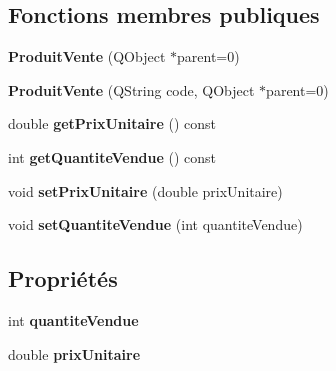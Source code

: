 \subsection*{Fonctions membres publiques}
\begin{DoxyCompactItemize}
\item 
\hypertarget{class_core_1_1_produit_vente_acc72c533d8369d796efada34338ca196}{
{\bfseries ProduitVente} (QObject $\ast$parent=0)}
\label{d3/d4f/class_core_1_1_produit_vente_acc72c533d8369d796efada34338ca196}

\item 
\hypertarget{class_core_1_1_produit_vente_af9a077f070b97bdc21a58c836b74e616}{
{\bfseries ProduitVente} (QString code, QObject $\ast$parent=0)}
\label{d3/d4f/class_core_1_1_produit_vente_af9a077f070b97bdc21a58c836b74e616}

\item 
\hypertarget{class_core_1_1_produit_vente_a3da7b36ef38ff110d4a2ce8d42af723d}{
double {\bfseries getPrixUnitaire} () const }
\label{d3/d4f/class_core_1_1_produit_vente_a3da7b36ef38ff110d4a2ce8d42af723d}

\item 
\hypertarget{class_core_1_1_produit_vente_a349a1d192d301398d84ba5bf875f7a03}{
int {\bfseries getQuantiteVendue} () const }
\label{d3/d4f/class_core_1_1_produit_vente_a349a1d192d301398d84ba5bf875f7a03}

\item 
\hypertarget{class_core_1_1_produit_vente_a41a15298072493461f18d6161286100e}{
void {\bfseries setPrixUnitaire} (double prixUnitaire)}
\label{d3/d4f/class_core_1_1_produit_vente_a41a15298072493461f18d6161286100e}

\item 
\hypertarget{class_core_1_1_produit_vente_a451fa2e0bba35498cb525e3c905ce476}{
void {\bfseries setQuantiteVendue} (int quantiteVendue)}
\label{d3/d4f/class_core_1_1_produit_vente_a451fa2e0bba35498cb525e3c905ce476}

\end{DoxyCompactItemize}
\subsection*{Propriétés}
\begin{DoxyCompactItemize}
\item 
\hypertarget{class_core_1_1_produit_vente_ac1bf22361ff20e2c42ddff825d8941b3}{
int {\bfseries quantiteVendue}}
\label{d3/d4f/class_core_1_1_produit_vente_ac1bf22361ff20e2c42ddff825d8941b3}

\item 
\hypertarget{class_core_1_1_produit_vente_aa979cd9cc655cfbd93648ab136ffe68e}{
double {\bfseries prixUnitaire}}
\label{d3/d4f/class_core_1_1_produit_vente_aa979cd9cc655cfbd93648ab136ffe68e}

\end{DoxyCompactItemize}


